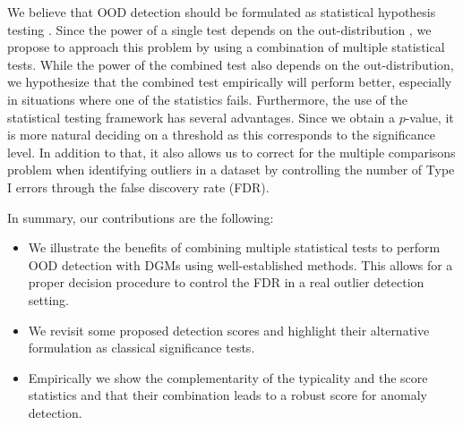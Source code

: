 {We believe that OOD detection should be formulated as statistical hypothesis testing \parencite{nalisnick_detecting_2019, ahmadian_likelihoodfree_2021, haroush_statistical_2021}. Since the power of a single test depends on the out-distribution \parencite{zhang_understanding_2021}, we propose to approach this problem by using a combination of multiple statistical tests. %
While the power of the combined test also depends on the out-distribution, we hypothesize that the combined test empirically will perform better, especially in situations where one of the statistics fails.
%
Furthermore, the use of the statistical testing framework has several advantages. Since we obtain a $p$-value, it is more natural deciding on a threshold as this corresponds to the significance level. In addition to that, it also allows us to correct for the multiple comparisons problem when identifying outliers in a dataset by controlling the number of Type I errors through the false discovery rate (FDR).

In summary, our contributions are the following:
\begin{itemize}
    \item We illustrate the benefits of combining multiple statistical tests to perform OOD detection with DGMs using well-established methods. This allows for a proper decision procedure to control the FDR in a real outlier detection setting.
    \item We revisit some proposed detection scores and highlight their alternative formulation as classical significance tests.
    \item Empirically we show the complementarity of the typicality and the score statistics and that their combination leads to a robust score for anomaly detection. %
\end{itemize}
%

}
